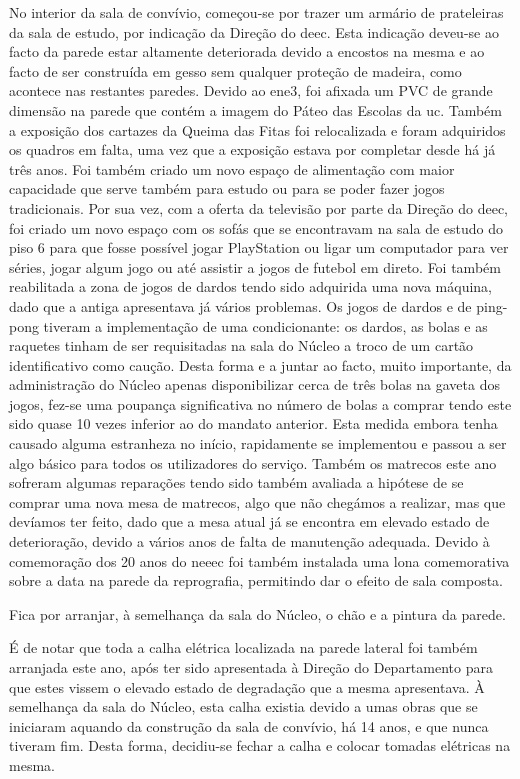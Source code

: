No interior da sala de convívio, começou-se por trazer um armário de prateleiras da sala de estudo, por indicação da Direção do \acrshort{deec}. Esta indicação deveu-se ao facto da parede estar altamente deteriorada devido a encostos na mesma e ao facto de ser construída em gesso sem qualquer proteção de madeira, como acontece nas restantes paredes. Devido ao \acrshort{ene3}, foi afixada um PVC de grande dimensão na parede que contém a imagem do Páteo das Escolas da \acrlong{uc}. Também a exposição dos cartazes da Queima das Fitas foi relocalizada e foram adquiridos os quadros em falta, uma vez que a exposição estava por completar desde há já três anos. Foi também criado um novo espaço de alimentação com maior capacidade que serve também para estudo ou para se poder fazer jogos tradicionais. Por sua vez, com a oferta da televisão por parte da Direção do \acrshort{deec}, foi criado um novo espaço com os sofás que se encontravam na sala de estudo do piso 6 para que fosse possível jogar PlayStation ou ligar um computador para ver séries, jogar algum jogo ou até assistir a jogos de futebol em direto. Foi também reabilitada a zona de jogos de dardos tendo sido adquirida uma nova máquina, dado que a antiga apresentava já vários problemas. Os jogos de dardos e de ping-pong tiveram a implementação de uma condicionante: os dardos, as bolas e as raquetes tinham de ser requisitadas na sala do Núcleo a troco de um cartão identificativo como caução. Desta forma e a juntar ao facto, muito importante, da administração do Núcleo apenas disponibilizar cerca de três bolas na gaveta dos jogos, fez-se uma poupança significativa no número de bolas a comprar tendo este sido quase 10 vezes inferior ao do mandato anterior. Esta medida embora tenha causado alguma estranheza no início, rapidamente se implementou e passou a ser algo básico para todos os utilizadores do serviço. Também os matrecos este ano sofreram algumas reparações tendo sido também avaliada a hipótese de se comprar uma nova mesa de matrecos, algo que não chegámos a realizar, mas que devíamos ter feito, dado que a mesa atual já se encontra em elevado estado de deterioração, devido a vários anos de falta de manutenção adequada. Devido à comemoração dos 20 anos do \acrshort{neeec} foi também instalada uma lona comemorativa sobre a data na parede da reprografia, permitindo dar o efeito de sala composta.

Fica por arranjar, à semelhança da sala do Núcleo, o chão e a pintura da parede.

É de notar que toda a calha elétrica localizada na parede lateral foi também arranjada este ano, após ter sido apresentada à Direção do Departamento para que estes vissem o elevado estado de degradação que a mesma apresentava. À semelhança da sala do Núcleo, esta calha existia devido a umas obras que se iniciaram aquando da construção da sala de convívio, há 14 anos, e que nunca tiveram fim. Desta forma, decidiu-se fechar a calha e colocar tomadas elétricas na mesma.